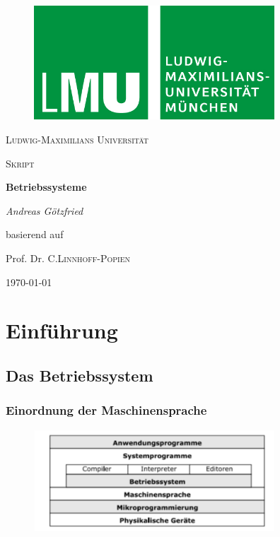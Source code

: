 \documentclass{article}
\begin{document}
\begin{titlepage}
\centering
    \begin{figure}
    \centering
	    \includegraphics[width=90mm]{logo_lmu.jpg}
    \end{figure}
	{\scshape\LARGE Ludwig-Maximilians Universität \par}
	\vspace{1cm}
	{\scshape\Large Skript \par}
	\vspace{1.5cm}
	{\huge\bfseries Betriebssysteme\par}
	\vspace{2cm}
	{\Large\itshape Andreas Götzfried\par}
    \vfill
	    basierend auf\par
	    Prof. Dr. C.\textsc{Linnhoff-Popien}
    \vfill
	{\large \today\par}
\end{titlepage}
\tableofcontents{}

\newpage
\section{Einführung}
\subsection{Das Betriebssystem}
\subsubsection{Einordnung der Maschinensprache}
    \begin{figure}[h]
        \centering
	    \includegraphics[width=90mm]{Skizzen/1. Kapitel/Hierarchie-der-Funktionen .png}
    \end{figure}
\end{document}
